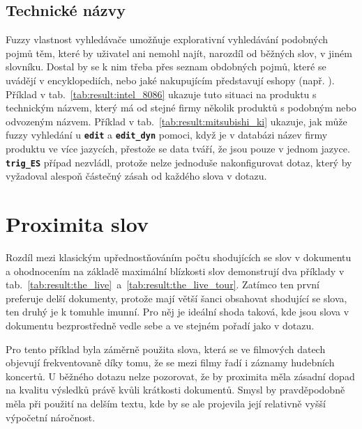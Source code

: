 \documentclass[11pt,letterpaper,oneside,openright]{book}
\newcommand{\bftt}[1]{\texttt{\textbf{#1}}}
\begin{document}
\subsection{Technické názvy}

\mbox{}\mbox{}

Fuzzy vlastnost vyhledávače umožňuje explorativní vyhledávání podobných pojmů
těm, které by uživatel ani nemohl najít, narozdíl od běžných slov, v jiném
slovníku. Dostal by se k nim třeba přes seznam obdobných pojmů, které se
uvádějí v encyklopediích, nebo jaké nakupujícím představují eshopy (např.
). Příklad v tab.~\ref{tab:result:intel_8086}
ukazuje tuto situaci na produktu s technickým názvem, který má od stejné firmy
několik produktů s podobným nebo odvozeným názvem. Příklad v
tab.~\ref{tab:result:mitsubishi_ki} ukazuje, jak může fuzzy vyhledání u
\bftt{edit} a \bftt{edit\_dyn} pomoci, když je v databázi název firmy produktu
ve více jazycích, přestože se data tváří, že jsou pouze v jednom jazyce.
\bftt{trig\_ES} případ nezvládl, protože nelze jednoduše nakonfigurovat dotaz,
který by vyžadoval alespoň částečný zásah od každého slova v dotazu.

\mbox{}\mbox{}




\section{Proximita slov}
Rozdíl mezi klasickým upřednostňováním počtu shodujících se slov v
dokumentu a ohodnocením na základě maximální blízkosti slov demonstrují
dva příklady v
tab.~\ref{tab:result:the_live}~a~\ref{tab:result:the_live_tour}. Zatímco
ten první preferuje delší dokumenty, protože mají větší šanci obsahovat
shodující se slova, ten druhý je k tomuhle imunní. Pro něj je ideální
shoda taková, kde jsou slova v dokumentu bezprostředně vedle sebe a ve
stejném pořadí jako v dotazu.

Pro tento příklad byla záměrně použita slova, která se ve filmových datech
objevují frekventovaně díky tomu, že se mezi filmy řadí i záznamy hudebních
koncertů. U běžného dotazu nelze pozorovat, že by proximita měla zásadní dopad
na kvalitu výsledků právě kvůli krátkosti dokumentů. Smysl by pravděpodobně
měla při použití na delším textu, kde by se ale projevila její relativně vyšší
výpočetní náročnost.


\mbox{}\mbox{}
\end{document}
